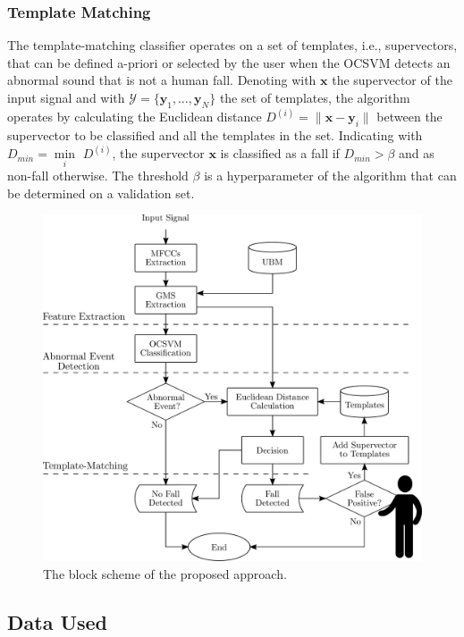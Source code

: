 \subsubsection{Template Matching}
The template-matching classifier operates on a set of templates, i.e., supervectors, that can be defined a-priori or selected by the user when the OCSVM detects an abnormal sound that is not a human fall. Denoting with $\mathbf{x}$ the supervector of the input signal and with $\mathcal{Y} = \{\mathbf{y}_1,\ldots,\mathbf{y}_N\}$ the set of templates, the algorithm operates by calculating the Euclidean distance $D^{(i)} = \| \mathbf{x} - \mathbf{y}_i \|$ between the supervector to be classified and all the templates in the set. Indicating with $D_{min} = \underset{i}{\min}\,\,D^{(i)}$, the supervector $\mathbf{x}$ is classified as a fall if $D_{min}>\beta$ and as non-fall otherwise. The threshold $\beta$ is a hyperparameter of the algorithm that can be determined on a validation set.

\begin{figure}[htb]
	\centering
	\includegraphics[width=0.95\columnwidth]{img/cin/approccioComplessivo.pdf}
	\caption{The block scheme of the proposed approach.}\label{fig:overall_ocsvm_user_aided}
\end{figure}

\subsection{Data Used}

